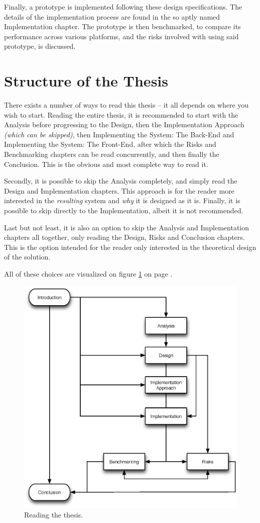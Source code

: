 		Finally, a prototype is implemented following these design specifications. The details of the implementation process are found in the so aptly named Implementation chapter. The prototype is then benchmarked, to compare its performance across various platforms, and the risks involved with using said prototype, is discussed.


	\section{Structure of the Thesis}
		There exists a number of ways to read this thesis -- it all depends on where you wish to start. Reading the entire thesis, it is recommended to start with the Analysis before progressing to the Design, then the Implementation Approach \emph{(which can be skipped)}, then Implementing the System: The Back-End and Implementing the System: The Front-End, after which the Risks and Benchmarking chapters can be read concurrently, and then finally the Conclusion. This is the obvious and most complete way to read it.

		Secondly, it is possible to skip the Analysis completely, and simply read the Design and Implementation chapters. This approach is for the reader more interested in the \emph{resulting} system and \emph{why} it is designed as it is. Finally, it is possible to skip directly to the Implementation, albeit it is not recommended. 

		Last but not least, it is also an option to skip the Analysis and Implementation chapters all together, only reading the Design, Risks and Conclusion chapters. This is the option intended for the reader only interested in the theoretical design of the solution.

		All of these choices are visualized on figure \ref{fig:reading:the:thesis} on page \pageref{fig:reading:the:thesis}.



		\begin{figure}[!htb]
			\centering
			\includegraphics[width=1\textwidth]{figures/intro/reading.eps}
			\caption{Reading the thesis.}
			\label{fig:reading:the:thesis}
		\end{figure}



